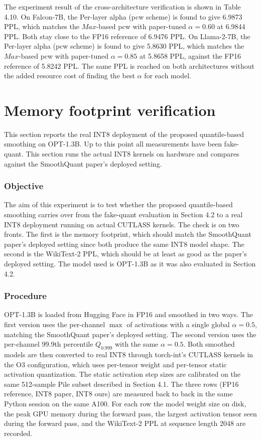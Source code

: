 The experiment result of the cross-architecture verification is shown in Table 4.10. On Falcon-7B, the Per-layer alpha (pcw scheme) is found to give 6.9873 PPL, which matches the $Max$-based pcw with paper-tuned $\alpha=0.60$ at 6.9844 PPL. Both stay close to the FP16 reference of 6.9476 PPL. On Llama-2-7B, the Per-layer alpha (pcw scheme) is found to give 5.8630 PPL, which matches the $Max$-based pcw with paper-tuned $\alpha=0.85$ at 5.8658 PPL, against the FP16 reference of 5.8242 PPL. The same PPL is reached on both architectures without the added resource cost of finding the best $\alpha$ for each model.


\section{Memory footprint verification}

This section reports the real INT8 deployment of the proposed quantile-based smoothing on OPT-1.3B. Up to this point all measurements have been fake-quant. This section runs the actual INT8 kernels on hardware and compares against the SmoothQuant paper's deployed setting.

\subsubsection*{Objective}
The aim of this experiment is to test whether the proposed quantile-based smoothing carries over from the fake-quant evaluation in Section 4.2 to a real INT8 deployment running on actual CUTLASS kernels. The check is on two fronts. The first is the memory footprint, which should match the SmoothQuant paper's deployed setting since both produce the same INT8 model shape. The second is the WikiText-2 PPL, which should be at least as good as the paper's deployed setting. The model used is OPT-1.3B as it was also evaluated in Section 4.2.

\subsubsection*{Procedure}
OPT-1.3B is loaded from Hugging Face in FP16 and smoothed in two ways. The first version uses the per-channel $\max$ of activations with a single global $\alpha=0.5$, matching the SmoothQuant paper's deployed setting. The second version uses the per-channel 99.9th percentile $Q_{0.999}$ with the same $\alpha=0.5$. Both smoothed models are then converted to real INT8 through torch-int's CUTLASS kernels in the O3 configuration, which uses per-tensor weight and per-tensor static activation quantization. The static activation step sizes are calibrated on the same 512-sample Pile subset described in Section 4.1. The three rows (FP16 reference, INT8 paper, INT8 ours) are measured back to back in the same Python session on the same A100. For each row the model weight size on disk, the peak GPU memory during the forward pass, the largest activation tensor seen during the forward pass, and the WikiText-2 PPL at sequence length 2048 are recorded.

